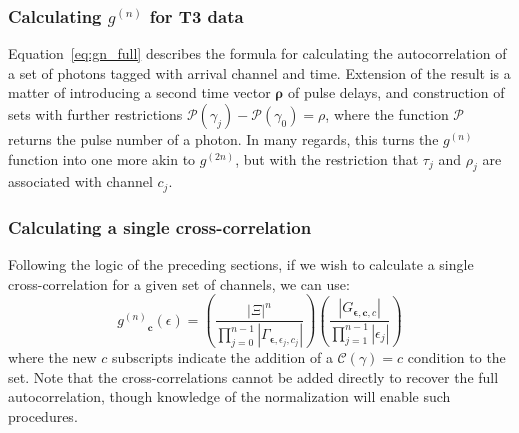 \documentclass{article}
\newcommand{\parens}[1]{\ensuremath{\left( #1 \right)}}
\newcommand{\gn}[1]{\ensuremath{g^{(#1)}}}
\renewcommand{\vec}{\boldsymbol}
\newcommand{\abs}[1]{\ensuremath{\left|#1\right|}}
\newcommand{\channel}{\ensuremath{c}}
\newcommand{\channels}{\ensuremath{C}}
\newcommand{\Channel}{\ensuremath{\mathcal{C}}}
\newcommand{\photon}{\ensuremath{\gamma}}
\newcommand{\photons}{\ensuremath{\Gamma}}
\newcommand{\Pulse}{\ensuremath{\mathcal{P}}}
\newcommand{\integrationtime}{\ensuremath{\Xi}}
\newcommand{\resolution}{\ensuremath{\epsilon}}
\newcommand{\correlationset}{\ensuremath{G}}
\begin{document}

\subsubsection{Calculating \gn{n} for T3 data}
Equation~\ref{eq:gn_full} describes the formula for calculating the autocorrelation of a set of photons tagged with arrival channel and time. Extension of the result is a matter of introducing a second time vector $\vec{\rho}$ of pulse delays, and construction of sets with further restrictions $\Pulse(\photon_{j})-\Pulse(\photon_{0})=\rho$, where the function $\Pulse$ returns the pulse number of a photon. In many regards, this turns the \gn{n} function into one more akin to \gn{2n}, but with the restriction that $\tau_{j}$ and $\rho_{j}$ are associated with channel $\channel_{j}$.

\subsubsection{Calculating a single cross-correlation}
Following the logic of the preceding sections, if we wish to calculate a single cross-correlation for a given set of channels, we can use:
\begin{equation}
\label{eq:cross_correlation_full}
\gn{n}_{\vec{\channel}}\parens{\resolution}  = 
       \parens{\frac{\abs{\integrationtime}^{n}}
                    {\prod_{j=0}^{n-1}
                           {\abs{\photons_{
                                        \vec{\resolution},
                                        \resolution_{j},
                                        \channel_{j}}}}}}
      \parens{\frac{\abs{\correlationset_{\vec{\resolution},
                                          \vec{\channel},
                                          \channel}}}
                   {\prod_{j=1}^{n-1}{\abs{\resolution_{j}}}}}
\end{equation}
where the new $\channel$  subscripts indicate the addition of a $\Channel(\photon)=c$ condition to the set. Note that the cross-correlations cannot be added directly to recover the full autocorrelation, though knowledge of the normalization will enable such procedures.
\end{document}
